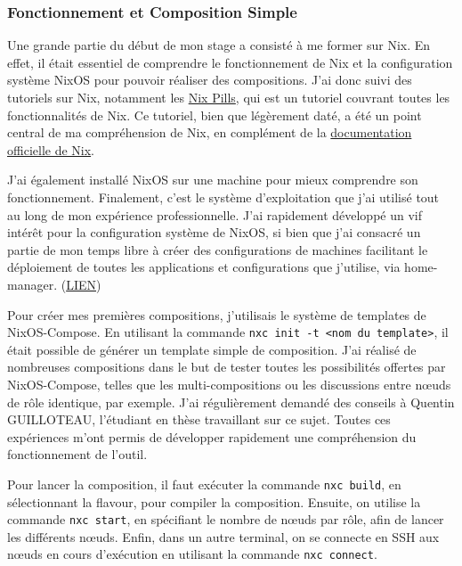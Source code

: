 \documentclass[a4paper,french,12pt, titlepage]{article}
\begin{document}
\hypertarget{fonctionnement-et-composition-simple}{%
\subsubsection{Fonctionnement et Composition
Simple}\label{fonctionnement-et-composition-simple}}

Une grande partie du début de mon stage a consisté à me former sur Nix.
En effet, il était essentiel de comprendre le fonctionnement de Nix et
la configuration système NixOS pour pouvoir réaliser des compositions.
J'ai donc suivi des tutoriels sur Nix, notamment les
\href{https://nixos.org/guides/nix-pills/}{Nix Pills}, qui est un
tutoriel couvrant toutes les fonctionnalités de Nix. Ce tutoriel, bien
que légèrement daté, a été un point central de ma compréhension de Nix,
en complément de la
\href{https://nixos.org/manual/nix/stable/}{documentation officielle de
Nix}.\newline

J'ai également installé NixOS sur une machine pour mieux comprendre son
fonctionnement. Finalement, c'est le système d'exploitation que j'ai
utilisé tout au long de mon expérience professionnelle. J'ai rapidement
développé un vif intérêt pour la configuration système de NixOS, si bien
que j'ai consacré un partie de mon temps libre à créer des
configurations de machines facilitant le déploiement de toutes les
applications et configurations que j'utilise, via home-manager.
(\href{https://github.com/alexandreLITHAUD/my-nix-configuration}{LIEN})\newline

Pour créer mes premières compositions, j'utilisais le système de
templates de NixOS-Compose. En utilisant la commande
\texttt{nxc\ init\ -t\ \textless{}nom\ du\ template\textgreater{}}, il
était possible de générer un template simple de composition. J'ai
réalisé de nombreuses compositions dans le but de tester toutes les
possibilités offertes par NixOS-Compose, telles que les
multi-compositions ou les discussions entre nœuds de rôle identique, par
exemple. J'ai régulièrement demandé des conseils à Quentin GUILLOTEAU,
l'étudiant en thèse travaillant sur ce sujet. Toutes ces expériences
m'ont permis de développer rapidement une compréhension du
fonctionnement de l'outil.\newline

Pour lancer la composition, il faut exécuter la commande
\texttt{nxc\ build}, en sélectionnant la flavour, pour compiler la
composition. Ensuite, on utilise la commande \texttt{nxc\ start}, en
spécifiant le nombre de nœuds par rôle, afin de lancer les différents
nœuds. Enfin, dans un autre terminal, on se connecte en SSH aux nœuds en
cours d'exécution en utilisant la commande
\texttt{nxc\ connect}.\newline
\end{document}

